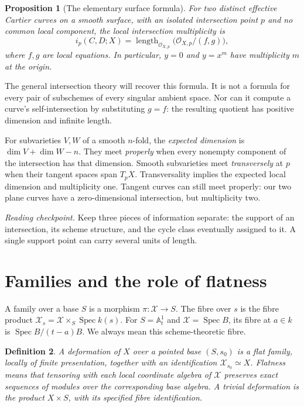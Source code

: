 \documentclass[11pt,a4paper]{article}
\numberwithin{equation}{section}
\newtheorem{definition}{Definition}[section]
\newtheorem{proposition}[definition]{Proposition}
\theoremstyle{definition}
\newcommand{\A}{\mathbb A}
\newcommand{\OO}{\mathcal O}
\newcommand{\Spec}{\operatorname{Spec}}
\newcommand{\length}{\operatorname{length}}
\newcommand{\source}[1]{\par\smallskip{\small\textit{Reference.} #1}\par}
\newcommand{\reading}[1]{\par\smallskip\textit{Reading checkpoint.} #1\par}
\begin{document}
\begin{proposition}[The elementary surface formula]
For two distinct effective Cartier curves on a smooth surface, with an
isolated intersection point $p$ and no common local component, the local
intersection multiplicity is
\[
i_p(C,D;X)=\length_{\OO_{X,p}}
\bigl(\OO_{X,p}/(f,g)\bigr),
\]
where $f,g$ are local equations. In particular, $y=0$ and $y=x^m$ have
multiplicity $m$ at the origin.
\end{proposition}

The general intersection theory will recover this formula. It is not
a formula for every pair of subschemes of every singular ambient space.
Nor can it compute a curve's self-intersection by substituting $g=f$:
the resulting quotient has positive dimension and infinite length.

For subvarieties $V,W$ of a smooth $n$-fold, the \emph{expected dimension}
is $\dim V+\dim W-n$. They meet \emph{properly} when every nonempty
component of the intersection has that dimension. Smooth subvarieties
meet \emph{transversely} at $p$ when their tangent spaces span $T_pX$.
Transversality implies the expected local dimension and multiplicity
one. Tangent curves can still meet properly: our two plane curves have
a zero-dimensional intersection, but multiplicity two.

\reading{Keep three pieces of information separate: the support of an
intersection, its scheme structure, and the cycle class eventually
assigned to it. A single support point can carry several units of length.}
\source{Fulton~\cite{FIntro}, \S\S2.1--2.4.}

\section{Families and the role of flatness}
\label{sec:flatness}

A family over a base $S$ is a morphism $\pi:\mathcal X\to S$. The fibre
over $s$ is the fibre product $\mathcal X_s=\mathcal X\times_S\Spec k(s)$.
For $S=\A^1_t$ and $\mathcal X=\Spec B$, its fibre at $a\in k$ is
$\Spec B/(t-a)B$. We always mean this scheme-theoretic fibre.

\begin{definition}
A deformation of $X$ over a pointed base $(S,s_0)$ is a flat family,
locally of finite presentation, together with an identification
$\mathcal X_{s_0}\simeq X$. Flatness means that tensoring with each local
coordinate algebra of $\mathcal X$ preserves exact sequences of modules
over the corresponding base algebra. A trivial deformation is the
product $X\times S$, with its specified fibre identification.
\end{definition}
\end{document}
